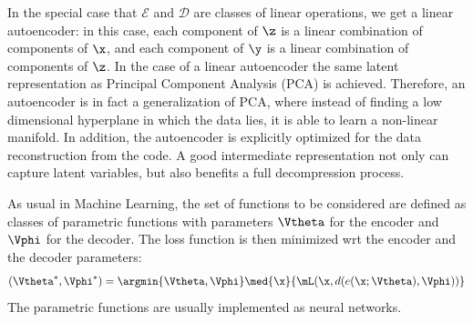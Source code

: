 In the special case that $\mathcal{E}$ and $\mathcal{D}$ are classes of linear operations, we get a linear autoencoder: in this case, each component of $\z$ is a linear combination of components of $\x$, and each component of $\y$ is a linear combination of components of $\z$. In the case of a linear autoencoder the same latent representation as Principal Component Analysis (PCA) is achieved. Therefore, an autoencoder is in fact a generalization of PCA, where instead of finding a low dimensional hyperplane in which the data lies, it is able to learn a non-linear manifold. In addition, the autoencoder is explicitly optimized for the data reconstruction from the code. A good intermediate representation not only can capture latent variables, but also benefits a full decompression process.

As usual in Machine Learning, the set of functions to be considered are defined as classes of parametric functions with parameters $\Vtheta$ for the encoder and $\Vphi$ for the decoder. The loss function is then minimized wrt the encoder and the decoder parameters:
\begin{equation*}
(\Vtheta^*,\Vphi^*) = \argmin{\Vtheta,\Vphi}\med{\x}{\mL(\x, d(e(\x;\Vtheta), \Vphi))}
\end{equation*}
The parametric functions are usually implemented as neural networks.

